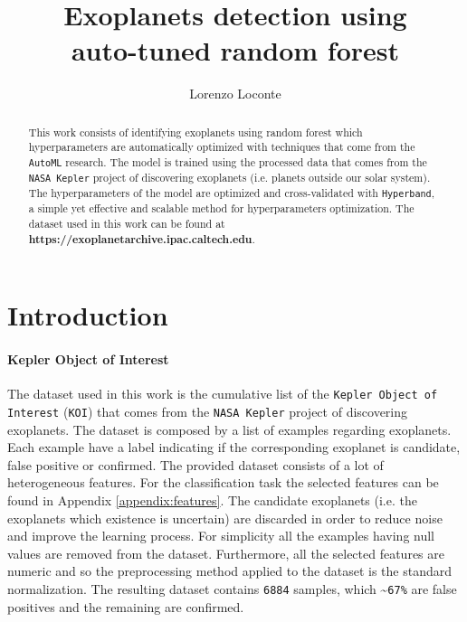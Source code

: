 \documentclass[11pt, a4paper]{article}
\date{}
\title{Exoplanets detection using \\ auto-tuned random forest}
\author{Lorenzo Loconte}
\begin{document}
\maketitle
\begin{abstract}
  This work consists of identifying exoplanets using random forest which hyperparameters are automatically optimized with techniques that come from the \texttt{AutoML} research.
  The model is trained using the processed data that comes from the \texttt{NASA Kepler} project of discovering exoplanets (i.e. planets outside our solar system).
  The hyperparameters of the model are optimized and cross-validated with \texttt{Hyperband}, a simple yet effective and scalable method for hyperparameters optimization.
  The dataset used in this work can be found at \textbf{https://exoplanetarchive.ipac.caltech.edu}.
\end{abstract}

\section{Introduction}
  \paragraph{Kepler Object of Interest}
    The dataset used in this work is the cumulative list of the \texttt{Kepler Object of Interest} (\texttt{KOI}) that comes from the \texttt{NASA Kepler} project of discovering exoplanets.
    The dataset is composed by a list of examples regarding exoplanets. Each example have a label indicating if the corresponding exoplanet is candidate, false positive or confirmed. The provided dataset consists of a lot of heterogeneous features. For the classification task the selected features can be found in Appendix \ref{appendix:features}. The candidate exoplanets (i.e. the exoplanets which existence is uncertain) are discarded in order to reduce noise and improve the learning process.
    For simplicity all the examples having null values are removed from the dataset. Furthermore, all the selected features are numeric and so the preprocessing method applied to the dataset is the standard normalization.
    The resulting dataset contains \texttt{6884} samples, which \textasciitilde \texttt{67\%} are false positives and the remaining are confirmed.
    
\end{document}
